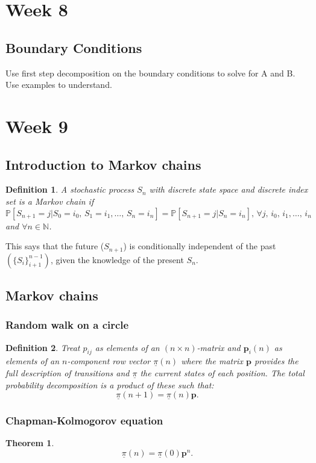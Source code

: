 \documentclass{article}
\newtheorem{theorem}{Theorem}
\newtheorem{definition}{Definition}
\newcommand{\Prob}{\mathbb{P}}
\begin{document}
\section{Week 8}
\subsection{Boundary Conditions}
Use first step decomposition on the boundary conditions to solve for A and B. Use examples to understand.

\section{Week 9}
\subsection{Introduction to Markov chains}
\begin{definition}
    A stochastic process $S_n$ with discrete state space and discrete index set is a Markov chain if $\Prob[S_{n+1}=j\vert S_0=i_0,\,S_1=i_1,\ldots,\,S_n=i_n]=\Prob[S_{n+1}=j\vert S_n=i_n],\,\forall j,\, i_0,\, i_1,\ldots,\,i_n$ and $\forall n\in \mathbb{N}$.
\end{definition}
This says that the future ($S_{n+1}$) is conditionally independent of the past $(\{ S_i \}_{i+1}^{n-1})$, given the knowledge of the present $S_n$.
\subsection{Markov chains}
\subsubsection{Random walk on a circle}
\begin{definition}
    Treat $p_{ij}$ as elements of an $(n\times n)$-matrix and $\mathbf{p}_i (n)$ as elements of an $n$-component row vector $\underline{\pi}(n)$ where the matrix $\mathbf{p}$ provides the full description of transitions and $\underline{\pi}$ the current states of each position. The total probability decomposition is a product of these such that:
    \begin{equation}
        \underline{\pi}(n+1)=\underline{\pi}(n)\mathbf{p}.
    \end{equation}
\end{definition}
\subsubsection{Chapman-Kolmogorov equation}
\begin{theorem}
    \begin{equation}
        \underline{\pi}(n)=\underline{\pi}(0)\mathbf{p}^n.
    \end{equation}
\end{theorem}
\end{document}
